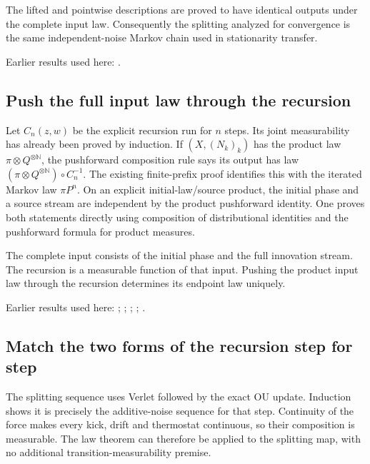 \documentclass[11pt,a4paper]{report}
\begin{document}
The lifted and pointwise descriptions are proved to have identical outputs under the complete input law. Consequently the splitting analyzed for convergence is the same independent-noise Markov chain used in stationarity transfer.



Earlier results used here: \cite[Section~3.33]{LangevinLean2026ULASC}.
\subsection{\texorpdfstring{Push the full input law through the recursion}{Push the full input law through the recursion}}
\label{report-step-KineticLangevin-SplittingLaw-lean-1}


Let \(C_n(z,w)\) be the explicit recursion run for \(n\) steps. Its joint measurability has already been proved by induction. If \((X,(N_k)_k)\) has the product law \(\pi\otimes Q^{\otimes\mathbb N}\), the pushforward composition rule says its output has law \((\pi\otimes Q^{\otimes\mathbb N})\circ C_n^{-1}\). The existing finite-prefix proof identifies this with the iterated Markov law \(\pi P^n\). On an explicit initial-law/\allowbreak{}source product, the initial phase and a source stream are independent by the product pushforward identity. One proves both statements directly using composition of distributional identities and the pushforward formula for product measures.



The complete input consists of the initial phase and the full innovation stream. The recursion is a measurable function of that input. Pushing the product input law through the recursion determines its endpoint law uniquely.



Earlier results used here: \cite[Section~3.20.1]{LangevinLean2026ULASC}; \cite[Section~3.20.4]{LangevinLean2026ULASC}; \cite[Section~3.20.5]{LangevinLean2026ULASC}; \cite[Section~3.33.6]{LangevinLean2026ULASC}; \cite[Section~3.33.9]{LangevinLean2026ULASC}.
\subsection{\texorpdfstring{Match the two forms of the recursion step for step}{Match the two forms of the recursion step for step}}
\label{report-step-KineticLangevin-SplittingLaw-lean-2}


The splitting sequence uses Verlet followed by the exact OU update. Induction shows it is precisely the additive-noise sequence for that step. Continuity of the force makes every kick, drift and thermostat continuous, so their composition is measurable. The law theorem can therefore be applied to the splitting map, with no additional transition-measurability premise.
\end{document}
